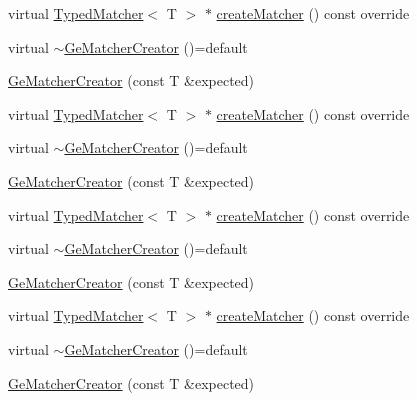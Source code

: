 \begin{DoxyCompactItemize}
virtual \mbox{\hyperlink{structfakeit_1_1TypedMatcher}{Typed\+Matcher}}$<$ T $>$ $\ast$ \mbox{\hyperlink{structfakeit_1_1internal_1_1GeMatcherCreator_abdd98f20fef3c4eae426d4f6e31e24b2}{create\+Matcher}} () const override
\item 
virtual \mbox{\hyperlink{structfakeit_1_1internal_1_1GeMatcherCreator_aede79743afe7c3709b869d12a81538f2}{$\sim$\+Ge\+Matcher\+Creator}} ()=default
\item 
\mbox{\hyperlink{structfakeit_1_1internal_1_1GeMatcherCreator_a71dea5672e8e0df897ed4a4f12e266ce}{Ge\+Matcher\+Creator}} (const T \&expected)
\item 
virtual \mbox{\hyperlink{structfakeit_1_1TypedMatcher}{Typed\+Matcher}}$<$ T $>$ $\ast$ \mbox{\hyperlink{structfakeit_1_1internal_1_1GeMatcherCreator_abdd98f20fef3c4eae426d4f6e31e24b2}{create\+Matcher}} () const override
\item 
virtual \mbox{\hyperlink{structfakeit_1_1internal_1_1GeMatcherCreator_aede79743afe7c3709b869d12a81538f2}{$\sim$\+Ge\+Matcher\+Creator}} ()=default
\item 
\mbox{\hyperlink{structfakeit_1_1internal_1_1GeMatcherCreator_a71dea5672e8e0df897ed4a4f12e266ce}{Ge\+Matcher\+Creator}} (const T \&expected)
\item 
virtual \mbox{\hyperlink{structfakeit_1_1TypedMatcher}{Typed\+Matcher}}$<$ T $>$ $\ast$ \mbox{\hyperlink{structfakeit_1_1internal_1_1GeMatcherCreator_abdd98f20fef3c4eae426d4f6e31e24b2}{create\+Matcher}} () const override
\item 
virtual \mbox{\hyperlink{structfakeit_1_1internal_1_1GeMatcherCreator_aede79743afe7c3709b869d12a81538f2}{$\sim$\+Ge\+Matcher\+Creator}} ()=default
\item 
\mbox{\hyperlink{structfakeit_1_1internal_1_1GeMatcherCreator_a71dea5672e8e0df897ed4a4f12e266ce}{Ge\+Matcher\+Creator}} (const T \&expected)
\item 
virtual \mbox{\hyperlink{structfakeit_1_1TypedMatcher}{Typed\+Matcher}}$<$ T $>$ $\ast$ \mbox{\hyperlink{structfakeit_1_1internal_1_1GeMatcherCreator_abdd98f20fef3c4eae426d4f6e31e24b2}{create\+Matcher}} () const override
\item 
virtual \mbox{\hyperlink{structfakeit_1_1internal_1_1GeMatcherCreator_aede79743afe7c3709b869d12a81538f2}{$\sim$\+Ge\+Matcher\+Creator}} ()=default
\item 
\mbox{\hyperlink{structfakeit_1_1internal_1_1GeMatcherCreator_a71dea5672e8e0df897ed4a4f12e266ce}{Ge\+Matcher\+Creator}} (const T \&expected)
\item 

\end{DoxyCompactItemize}
